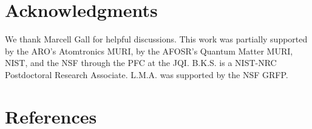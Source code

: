 \documentclass[12pt]{iopart}
\begin{document}
\section*{Acknowledgments}
We thank Marcell Gall for helpful discussions. This work was partially supported by the ARO’s Atomtronics MURI, by the
AFOSR’s Quantum Matter MURI, NIST, and the NSF through the PFC at the JQI. B.K.S. is
a NIST-NRC Postdoctoral Research Associate. L.M.A. was supported by the NSF GRFP.

\section*{References}
{}

\end{document}
